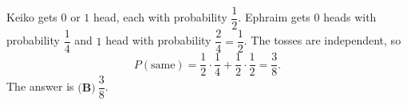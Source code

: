 Keiko gets $0$ or $1$ head, each with probability $\dfrac12$. Ephraim gets $0$ heads with probability $\dfrac14$ and $1$ head with probability $\dfrac24=\dfrac12$. The tosses are independent, so
\[P(\text{same})=\dfrac12\cdot\dfrac14+\dfrac12\cdot\dfrac12=\dfrac38.\]
The answer is $\boxed{\textbf{(B)}\ \dfrac38}$.
